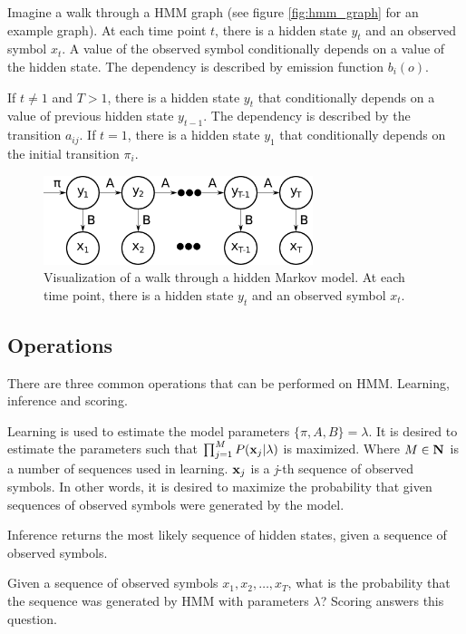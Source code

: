 \documentclass[thesis=B,english]{FITthesis}[2012/06/26]
\begin{document}
Imagine a walk through a HMM graph (see figure \ref{fig:hmm_graph} for an example graph). At each time point $t$, there is a hidden state $y_t$ and an observed symbol $x_t$. A value of the observed symbol conditionally depends on a value of the hidden state. The dependency is described by emission function $b_i(o)$.

If $t \neq 1$ and $T > 1$, there is a hidden state $y_t$ that conditionally depends on a value of previous hidden state $y_{t-1}$. The dependency is described by the transition $a_{ij}$. If $t = 1$, there is a hidden state $y_1$ that conditionally depends on the initial transition $\pi_i$.

\begin{figure}
	\centering
 	\includegraphics[width=0.7\textwidth]{hmm}
 	\caption{Visualization of a walk through a hidden Markov model. At each time point, there is a hidden state $y_t$ and an observed symbol $x_t$.}
 	\label{fig:hmm}
\end{figure}

\subsection{Operations}

There are three common operations that can be performed on HMM. Learning, inference and scoring.

Learning is used to estimate the model parameters $\{\pi, A, B\} = \lambda$. It is desired to estimate the parameters such that $\prod_{j=1}^{M} P(\textbf x_j | \lambda )$ is maximized. Where $M \in \textbf N$ is a number of sequences used in learning. $\textbf x_j$ is a \emph{j}-th sequence of observed symbols. In other words, it is desired to maximize the probability that given sequences of observed symbols were generated by the model.

Inference returns the most likely sequence of hidden states, given a sequence of observed symbols.

Given a sequence of observed symbols $x_1, x_2, \dots, x_T$, what is the probability that the sequence was generated by HMM with parameters $\lambda$? Scoring answers this question.
\end{document}
